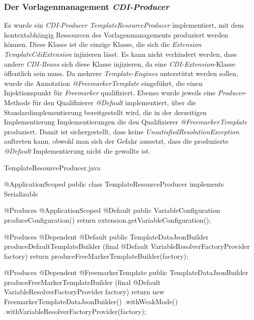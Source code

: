 \subsubsection{Der Vorlagenmanagement \emph{CDI-Producer}}
Es wurde ein \emph{CDI-Producer} \emph{TemplateResourceProducer} implementiert, mit dem kontextabhängig Ressourcen des Vorlagenmanagements produziert werden können. Diese Klasse ist die einzige Klasse, die sich die \emph{Extension TemplateCdiExtension} injizieren lässt. Es kann nicht verhindert werden, dass andere \emph{CDI-Beans} sich diese Klasse injizieren, da eine \emph{CDI-Extension}-Klasse öffentlich sein muss. Da mehrere \emph{Template-Engines} unterstützt werden sollen, wurde die Annotation \emph{@FreemarkerTemplate} eingeführt, die einen Injektionspunkt für \emph{Freemarker} qualifiziert. Ebenso wurde jeweils eine \emph{Producer}-Methode für den Qualifizierer \emph{@Default} implementiert, über die Standardimplementierung bereitgestellt wird, die in der derzeitigen Implementierung Implementierungen die den Qualifizierer \emph{@FreemarkerTemplate} produziert. Damit ist sichergestellt, dass keine \emph{UnsatisfiedResolutionException} auftreten kann, obwohl man sich der Gefahr aussetzt, dass die produzierte \emph{@Default} Implementierung nicht die gewollte ist.
\begin{program}[h]
\caption{TemplateResourceProducer.java}
\label{prog:templateResourceProducer}
\begin{JavaCode}
@ApplicationScoped
public class TemplateResourceProducer implements Serializable {
    @Produces
    @ApplicationScoped
    @Default
    public VariableConfiguration produceConfiguration() {
        return extension.getVariableConfiguration();
    }
    
    @Produces
    @Dependent
    @Default
    public TemplateDataJsonBuilder produceDefaultTemplateBuilder
          (final @Default VariableResolverFactoryProvider factory) {
        return produceFreeMarkerTemplateBuilder(factory);
    }

    @Produces
    @Dependent
    @FreemarkerTemplate
    public TemplateDataJsonBuilder produceFreeMarkerTemplateBuilder
           (final @Default VariableResolverFactoryProvider factory) {
        return new FreemarkerTemplateDataJsonBuilder()
                .withWeakMode()
                .withVariableResolverFactoryProvider(factory);
    }
}
\end{JavaCode}
\end{program}
\ \newline
